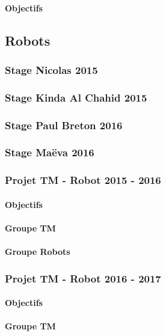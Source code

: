 \documentclass[french,a4paper]{book}
\begin{document}
\paragraph{Objectifs}

\subsection{Robots}
\subsubsection{Stage Nicolas 2015}
\subsubsection{Stage Kinda Al Chahid 2015}

\subsubsection{Stage Paul Breton 2016}
\subsubsection{Stage Maëva 2016}

\subsubsection{Projet TM - Robot 2015 - 2016}
\paragraph{Objectifs}
\paragraph{Groupe TM}
\paragraph{Groupe Robots}

\subsubsection{Projet TM - Robot 2016 - 2017}
\paragraph{Objectifs}
\paragraph{Groupe TM}
\end{document}
